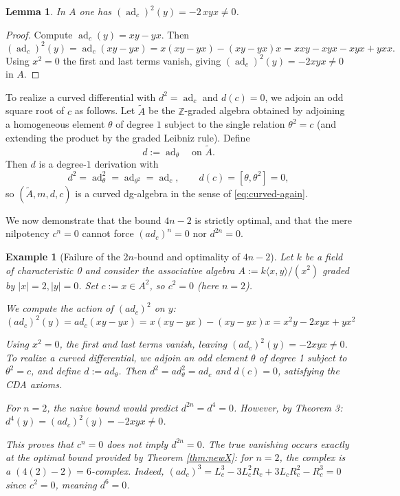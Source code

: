 \documentclass[preprint,12pt]{elsarticle}
\newcommand{\ad}{\operatorname{ad}}
\newtheorem{exmp}[defi]{Example}
\newtheorem{lem}[thm]{Lemma}
\begin{document}
\begin{lem}\label{lem:ad2-nonzero}
In $A$ one has $(\ad_c)^2(y)=-2\,x y x\neq 0$.
\end{lem}

\begin{proof}
Compute $\ad_c(y)=xy-yx$. Then
\[
(\ad_c)^2(y)=\ad_c(xy-yx)=x(xy-yx)-(xy-yx)x
= xxy-xyx-xyx+yxx.
\]
Using $x^2=0$ the first and last terms vanish, giving $(\ad_c)^2(y)=-2xyx\neq 0$ in $A$.
\end{proof}

To realize a curved differential with $d^2=\ad_c$ and $d(c)=0$, we adjoin an odd square root
of $c$ as follows. Let $\widetilde A$ be the $\mathbb{Z}$-graded algebra obtained by adjoining
a homogeneous element $\theta$ of degree $1$ subject to the single relation $\theta^2=c$
(and extending the product by the graded Leibniz rule). Define
\[
d:=\ad_\theta \quad\text{on }\widetilde A.
\]
Then $d$ is a degree-$1$ derivation with
\[
d^2=\ad_{\theta}^2=\ad_{\theta^2}=\ad_c,\qquad d(c)=[\theta,\theta^2]=0,
\]
so $(\widetilde A,m,d,c)$ is a curved dg-algebra in the sense of \eqref{eq:curved-again}.

We now demonstrate that the bound $4n-2$ is strictly optimal, and that the mere nilpotency $c^n=0$ cannot force $(ad_c)^n=0$ nor $d^{2n}=0$.

\begin{exmp}[Failure of the $2n$-bound and optimality of $4n-2$]\label{ex:counterexample}
Let $k$ be a field of characteristic 0 and consider the associative algebra $A := k\langle x, y \rangle / (x^2)$ graded by $|x|=2, |y|=0$. Set $c := x \in A^2$, so $c^2=0$ (here $n=2$).

We compute the action of $(ad_c)^2$ on $y$:
\[(ad_c)^2(y) = ad_c(xy - yx) = x(xy - yx) - (xy - yx)x = x^2y - 2xyx + yx^2\]

Using $x^2=0$, the first and last terms vanish, leaving $(ad_c)^2(y) = -2xyx \neq 0$. To realize a curved differential, we adjoin an odd element $\theta$ of degree 1 subject to $\theta^2=c$, and define $d := ad_\theta$. Then $d^2 = ad_\theta^2 = ad_c$ and $d(c)=0$, satisfying the CDA axioms.

For $n=2$, the naive bound would predict $d^{2n} = d^4 = 0$. However, by Theorem 3: $d^4(y) = (ad_c)^2(y) = -2xyx \neq 0$.

This proves that $c^n=0$ does not imply $d^{2n}=0$. The true vanishing occurs exactly at the optimal bound provided by Theorem \ref{thm:newX}: for $n=2$, the complex is a $(4(2)-2) = 6$-complex. Indeed, $(ad_c)^3 = L_c^3 - 3L_c^2 R_c + 3L_c R_c^2 - R_c^3 = 0$ since $c^2=0$, meaning $d^6=0$.
\end{exmp}
\end{document}
